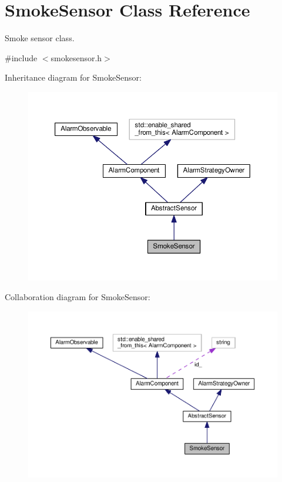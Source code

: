 \hypertarget{classSmokeSensor}{}\section{Smoke\+Sensor Class Reference}
\label{classSmokeSensor}


Smoke sensor class.  




{\ttfamily \#include $<$smokesensor.\+h$>$}



Inheritance diagram for Smoke\+Sensor\+:\nopagebreak
\begin{figure}[H]
\begin{center}
\leavevmode
\includegraphics[width=350pt]{classSmokeSensor__inherit__graph}
\end{center}
\end{figure}


Collaboration diagram for Smoke\+Sensor\+:\nopagebreak
\begin{figure}[H]
\begin{center}
\leavevmode
\includegraphics[width=350pt]{classSmokeSensor__coll__graph}
\end{center}
\end{figure}
